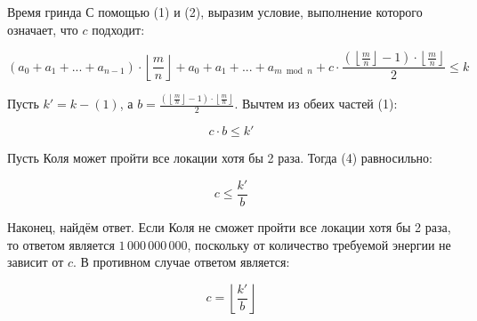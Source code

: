 \begin{tutorial}{Время гринда}
С помощью (1) и (2), выразим условие, выполнение которого означает, что $c$ подходит:

\begin{equation}
\left( a_0 + a_1 + ... + a_{n-1} \right) \cdot \left\lfloor \frac{m}{n} \right\rfloor + a_0 + a_1 + ... + a_{m \bmod{n}} + c \cdot \frac{\left( \left\lfloor \frac{m}{n} \right\rfloor - 1 \right) \cdot \left\lfloor \frac{m}{n} \right\rfloor}{2} \leq k %
\end{equation}

Пусть $k' = k - \left( 1 \right)$, а $\displaystyle b = \frac{\left( \left\lfloor \frac{m}{n} \right\rfloor - 1 \right) \cdot \left\lfloor \frac{m}{n} \right\rfloor}{2}$. Вычтем из обеих частей (1):

\begin{equation}
c \cdot b \leq k' %
\end{equation}

Пусть Коля может пройти все локации хотя бы 2 раза. Тогда (4) равносильно:

\begin{equation}
c \leq \frac{k'}{b} %
\end{equation}

Наконец, найдём ответ. Если Коля не сможет пройти все локации хотя бы 2 раза, то ответом является $1\,000\,000\,000$, поскольку от количество требуемой энергии не зависит от $c$. В противном случае ответом является:

\begin{equation}
c = \left\lfloor \frac{k'}{b} \right\rfloor %
\end{equation}

\end{tutorial}
